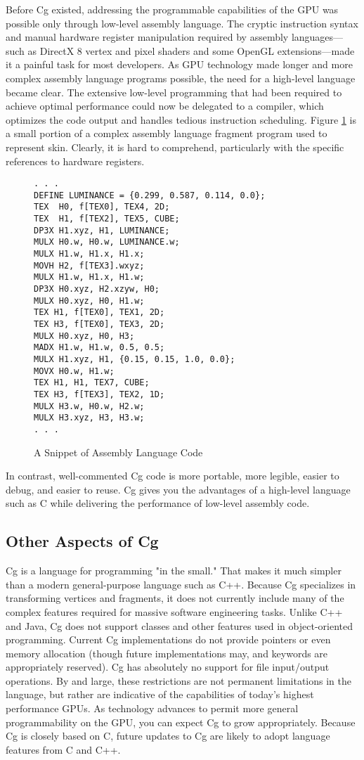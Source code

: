 \documentclass[../main.tex]{subfiles}
\begin{document}
Before Cg existed, addressing the programmable capabilities of the GPU was possible only through low-level assembly language. The cryptic instruction syntax and manual hardware register manipulation required by assembly languages—such as DirectX 8 vertex and pixel shaders and some OpenGL extensions—made it a painful task for most developers. As GPU technology made longer and more complex assembly language programs possible, the need for a high-level language became clear. The extensive low-level programming that had been required to achieve optimal performance could now be delegated to a compiler, which optimizes the code output and handles tedious instruction scheduling. Figure \ref{fig:1-1} is a small portion of a complex assembly language fragment program used to represent skin. Clearly, it is hard to comprehend, particularly with the specific references to hardware registers.

\begin{figure}
\begin{lstlisting}
. . .
DEFINE LUMINANCE = {0.299, 0.587, 0.114, 0.0};
TEX  H0, f[TEX0], TEX4, 2D;
TEX  H1, f[TEX2], TEX5, CUBE;
DP3X H1.xyz, H1, LUMINANCE;
MULX H0.w, H0.w, LUMINANCE.w;
MULX H1.w, H1.x, H1.x;
MOVH H2, f[TEX3].wxyz;
MULX H1.w, H1.x, H1.w;
DP3X H0.xyz, H2.xzyw, H0;
MULX H0.xyz, H0, H1.w;
TEX H1, f[TEX0], TEX1, 2D;
TEX H3, f[TEX0], TEX3, 2D;
MULX H0.xyz, H0, H3;
MADX H1.w, H1.w, 0.5, 0.5;
MULX H1.xyz, H1, {0.15, 0.15, 1.0, 0.0};
MOVX H0.w, H1.w;
TEX H1, H1, TEX7, CUBE;
TEX H3, f[TEX3], TEX2, 1D;
MULX H3.w, H0.w, H2.w;
MULX H3.xyz, H3, H3.w;
. . .
\end{lstlisting}
\caption{A Snippet of Assembly Language Code}
\label{fig:1-1}
\end{figure}

In contrast, well-commented Cg code is more portable, more legible, easier to debug, and easier to reuse. Cg gives you the advantages of a high-level language such as C while delivering the performance of low-level assembly code.

\subsection{Other Aspects of Cg}

Cg is a language for programming "in the small." That makes it much simpler than a modern general-purpose language such as C++. Because Cg specializes in transforming vertices and fragments, it does not currently include many of the complex features required for massive software engineering tasks. Unlike C++ and Java, Cg does not support classes and other features used in object-oriented programming. Current Cg implementations do not provide pointers or even memory allocation (though future implementations may, and keywords are appropriately reserved). Cg has absolutely no support for file input/output operations. By and large, these restrictions are not permanent limitations in the language, but rather are indicative of the capabilities of today's highest performance GPUs. As technology advances to permit more general programmability on the GPU, you can expect Cg to grow appropriately. Because Cg is closely based on C, future updates to Cg are likely to adopt language features from C and C++.
\end{document}
